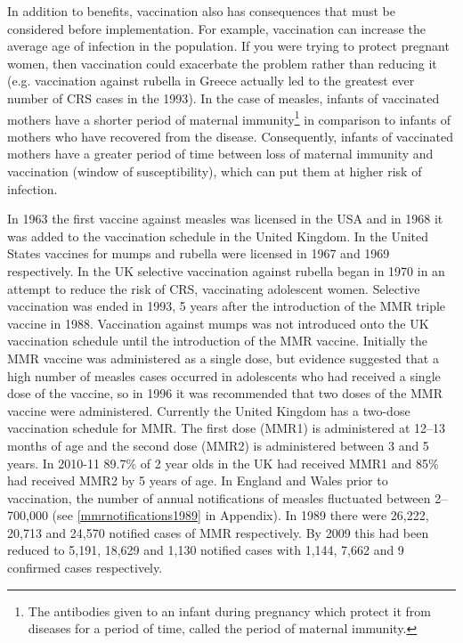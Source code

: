 \documentclass[a4paper,11pt] {scrartcl}
\begin{document}
In addition to benefits, vaccination also has consequences that must be considered before implementation. For example, vaccination can increase the average age of infection in the population. If you were trying to protect pregnant women, then vaccination could exacerbate the problem rather than reducing it (e.g. vaccination against rubella in Greece actually led to the greatest ever number of CRS cases in the 1993\cite{panagiotopoulos1999increase}). In the case of measles, infants of vaccinated mothers have a shorter period of maternal immunity\footnote{The antibodies given to an infant during pregnancy which protect it from diseases for a period of time, called the period of maternal immunity.} in comparison to infants of mothers who have recovered from the disease. Consequently, infants of vaccinated mothers  have a greater period of time between loss of maternal immunity and vaccination (window of susceptibility), which can put them at higher risk of infection\cite{leuridan2010early}.

In 1963 the first vaccine against measles was licensed in the USA\cite{lebaron2007measlespersistence} and in 1968 it was added to the vaccination schedule in the United Kingdom\cite{hpaimmunistationcoverage}. In the United States vaccines for mumps and rubella were licensed in 1967 and 1969 respectively\cite{lebaron2009mumpspersistence,lebaron2009rubellapersistence}. In the UK selective vaccination against rubella began in 1970 in an attempt to reduce the risk of CRS, vaccinating adolescent women. Selective vaccination was ended in 1993\cite{pebody2001seroepidemiology}, 5 years after the introduction of the MMR triple vaccine in 1988\cite{hpaimmunistationcoverage}. Vaccination against mumps was not introduced onto the UK vaccination schedule until the introduction of the MMR vaccine. Initially the MMR vaccine was administered as a single dose\cite{cohen2007vaccine}, but evidence suggested that a high number of measles cases occurred in adolescents who had received a single dose of the vaccine\cite{orenstein2004evolution}, so in 1996 it was recommended that two doses of the MMR vaccine were administered\cite{cohen2007vaccine}. Currently the United Kingdom has a two-dose vaccination schedule for MMR. The first dose (MMR1) is administered at 12--13 months of age and the second dose (MMR2) is administered between 3 and 5 years\cite{nhschoicesvaccinationmmr,nhschoicesvaccinationdates}. In 2010-11 89.7\% of 2 year olds in the UK had received MMR1 and 85\% had received MMR2 by 5 years of age\cite{vaccinationcoverage2011}. In England and Wales prior to vaccination, the number of annual notifications of measles fluctuated between 2--700,000 (see \autoref{mmrnotifications1989} in Appendix). In 1989 there were 26,222, 20,713 and 24,570 notified cases of MMR respectively. By 2009 this had been reduced to 5,191, 18,629 and 1,130 notified cases\cite{hpameaslesnotificationsbyage,hpamumpsnotificationsbyage,hparubellanotificationsbyage} with 1,144, 7,662 and 9 confirmed cases respectively\cite{hpammrconfirmedcases}.
\end{document}
